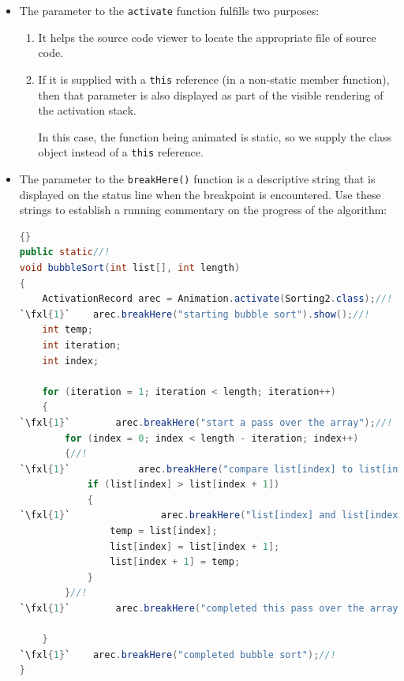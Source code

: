 \documentclass[11pt,titlepage]{book}
\def\fxl#1{%
\newdimen\fxlheight\setlength{\fxlheight}{#1\baselineskip}%
\advance\fxlheight by -0.5\baselineskip%
\begin{picture}(0,0)%
\setlength{\unitlength}{\baselineskip}%
\put(0,0){\makebox(0,0.75)[tl]{%
\colorbox{paleyellow}{%
\rule{0pt}{\fxlheight}%
\rule{\linewidth}{0pt}}%
}}\end{picture}%
}
\begin{document}
\begin{itemize}
\item The parameter to the \texttt{activate} function fulfills two purposes:
  \begin{enumerate}
  \item It helps the source code viewer to locate the appropriate file of
    source code.
  \item If it is supplied with a \texttt{this} reference (in a non-static member function), then that parameter is also displayed as part of the visible rendering of the activation stack.

    In this case, the function being animated is static, so we supply the class object instead of a \texttt{this} reference.
  \end{enumerate}

  \item The parameter to the \texttt{breakHere()} function is a
    descriptive string that is displayed on the status line when the
    breakpoint is encountered. Use these strings to establish a
    running commentary on the progress of the algorithm:
\begin{lstlisting}[language=Java,frame=tb]{}
public static//!
void bubbleSort(int list[], int length)
{
    ActivationRecord arec = Animation.activate(Sorting2.class);//!
`\fxl{1}`    arec.breakHere("starting bubble sort").show();//!
    int temp;
    int iteration;
    int index;

    for (iteration = 1; iteration < length; iteration++)
    {
`\fxl{1}`        arec.breakHere("start a pass over the array");//!
        for (index = 0; index < length - iteration; index++)
        {//!
`\fxl{1}`            arec.breakHere("compare list[index] to list[index+1]");//!
            if (list[index] > list[index + 1]) 
            {
`\fxl{1}`                arec.breakHere("list[index] and list[index+1] are out of order - swap them");//!
                temp = list[index];
                list[index] = list[index + 1];
                list[index + 1] = temp;
            }
        }//!
`\fxl{1}`        arec.breakHere("completed this pass over the array");//!

    }
`\fxl{1}`    arec.breakHere("completed bubble sort");//!
}
\end{lstlisting}
\end{itemize}
\end{document}
